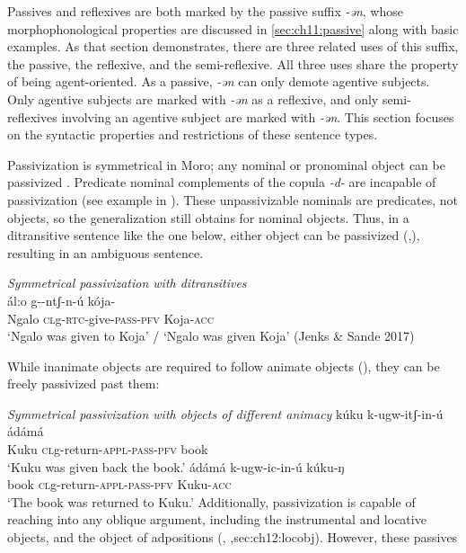 Passives and reflexives are both marked by the passive suffix \textit{-ən}, whose morphophonological properties are discussed in \ref{sec:ch11:passive} along with basic examples. As that section demonstrates, there are three related uses of this suffix, the passive, the reflexive, and the semi-reflexive. All three uses share the property of being agent-oriented. As a passive, \textit{-ən} can only demote agentive subjects. Only agentive subjects are marked with \textit{-ən} as a reflexive, and only semi-reflexives involving an agentive subject are marked with \textit{-ən}. This section focuses on the syntactic properties and restrictions of these sentence types. %
   
Passivization is symmetrical in Moro; any nominal or pronominal object can be passivized \citep{Ackerman:2015}. Predicate nominal complements of the copula \textit{-d-} are incapable of passivization (see example  in ). These unpassivizable nominals are predicates, not objects, so the generalization still obtains for nominal objects.   Thus, in a ditransitive sentence like the one below, either object can be passivized (,), resulting in an ambiguous sentence.

\ea \textit{Symmetrical passivization with ditransitives}\\
\gll  {}\'al:o g--ntʃ-n-\'u k\'oja-\textbf{}\\
Ngalo \textsc{cl}g-\textsc{rtc}-give-\textsc{pass}-\textsc{pfv} Koja-\textsc{acc}\\
\glt `Ngalo was given to Koja' / `Ngalo was given Koja' (Jenks \& Sande 2017)
\z 

While inanimate objects are required to follow animate objects (), they can be freely passivized past them:

\ea \textit{Symmetrical passivization with objects of different animacy}
\ea \gll kúku k-ugw-itʃ-in-ú ádámá\\
Kuku \textsc{cl}g-return-\textsc{appl-pass-pfv} book\\
\glt `Kuku was given back the book.'
\ex \gll ádámá k-ugw-ic-in-ú kúku-ŋ\\
book \textsc{cl}g-return-\textsc{appl-pass-pfv} Kuku-\textsc{acc}\\
\glt `The book was returned to Kuku.'
\z 
\z
Additionally, passivization is capable of reaching into any oblique argument, including the instrumental and locative objects, and the object of adpositions (, ,sec:ch12:locobj). However, these passives 

